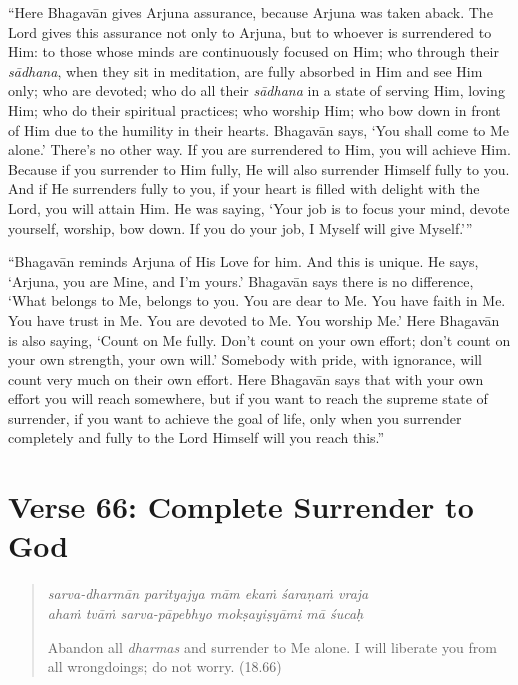 \documentclass[12pt, twoside, openright]{memoir}
\begin{document}
\enquote{Here Bhagavān gives Arjuna assurance, because Arjuna was taken aback. The Lord gives this assurance not only to Arjuna, but to whoever is surrendered to Him: to those whose minds are continuously focused on Him; who through their \textit{sādhana}, when they sit in meditation, are fully absorbed in Him and see Him only; who are devoted; who do all their \textit{sādhana} in a state of serving Him, loving Him; who do their spiritual practices; who worship Him; who bow down in front of Him due to the humility in their hearts. Bhagavān says, \enquote{You shall come to Me alone.} There’s no other way. If you are surrendered to Him, you will achieve Him. Because if you surrender to Him fully, He will also surrender Himself fully to you. And if He surrenders fully to you, if your heart is filled with delight with the Lord, you will attain Him. He was saying, \enquote{Your job is to focus your mind, devote yourself, worship, bow down. If you do your job, I Myself will give Myself.}}

\enquote{Bhagavān reminds Arjuna of His Love for him. And this is unique. He says, \enquote{Arjuna, you are Mine, and I’m yours.} Bhagavān says there is no difference, \enquote{What belongs to Me, belongs to you. You are dear to Me. You have faith in Me. You have trust in Me. You are devoted to Me. You worship Me.} Here Bhagavān is also saying, \enquote{Count on Me fully. Don’t count on your own effort; don’t count on your own strength, your own will.} Somebody with pride, with ignorance, will count very much on their own effort. Here Bhagavān says that with your own effort you will reach somewhere, but if you want to reach the supreme state of surrender, if you want to achieve the goal of life, only when you surrender completely and fully to the Lord Himself will you reach this.}

\section{Verse 66: Complete Surrender to God}\label{sec-verse-66-complete-surrender-to-god}


\par
\begin{verse}
\textit{sarva-dharmān parityajya mām ekaṁ śaraṇaṁ vraja} \\
\textit{ahaṁ tvāṁ sarva-pāpebhyo mokṣayiṣyāmi mā śucaḥ}

\noindent Abandon all \textit{dharmas} and surrender to Me alone. I will liberate you from all wrongdoings; do not worry. (18.66)
\end{verse}
\par
\end{document}
